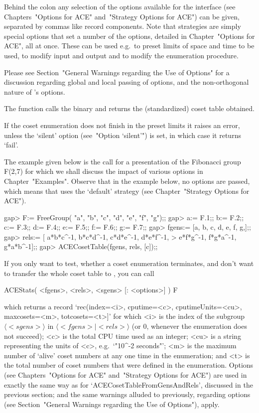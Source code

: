 Behind the colon any  selection  of  the  options  available  for  the
interface (see Chapters~"Options for ACE"  and~"Strategy  Options  for
ACE") can be given, separated by commas like record  components.  Note
that strategies are simply special options that set a  number  of  the
options, detailed in Chapter~"Options for ACE", all at once. These can
be used e.g.~to preset limits of space and time to be used, to  modify
input and output and to modify the enumeration procedure.

Please see Section~"General Warnings regarding the Use of Options" for
a discussion regarding global and local passing of  options,  and  the
non-orthogonal nature of {\ACE}'s options.

The function calls the {\ACE} binary and  returns  the  (standardized)
coset table obtained.

If the coset enumeration does not  finish  in  the  preset  limits  it
raises an error, unless the `silent' option (see~"Option `silent'") is
set, in which case it returns `fail'.

The example given  below  is  the  call  for  a  presentation  of  the
Fibonacci group F(2,7) for  which  we  shall  discuss  the  impact  of
various options in Chapter~"Examples". Observe  that  in  the  example
below, no options  are  passed,  which  means  that  {\ACE}  uses  the
`default' strategy (see Chapter~"Strategy Options for ACE").

\begintt
gap> F:= FreeGroup( "a", "b", "c", "d", "e", "f", "g");;
gap> a:= F.1;; b:= F.2;; c:= F.3;; d:= F.4;; e:= F.5;; f:= F.6;; g:= F.7;;
gap> fgens:= [a, b, c, d, e, f, g,];;
gap> rels:= [ a*b*c^-1, b*c*d^-1, c*d*e^-1, d*e*f^-1, 
>             e*f*g^-1, f*g*a^-1, g*a*b^-1];;
gap> ACECosetTable(fgens, rels, [c]);;
\endtt


If you only want to  test, whether a coset enumeration terminates, and
don't want to  transfer the whole coset table  to {\GAP}, you can call

\>ACEStats( <fgens>, <rels>, <sgens> [: <options>] ) F

which returns a record `rec(index=<i>, cputime=<c>, cputimeUnits=<cu>,
maxcosets=<m>, totcosets=<t>]' for which  <i>  is  the  index  of  the
subgroup $\langle <sgens> \rangle$ in  $\langle  <fgens>  \mid  <rels>
\rangle$ (or $0$, whenever the enumeration does not succeed);  <c>  is
the total CPU time used as an integer; <cu> is a  string  representing
the units of <c>, e.g.~`"10^-2 seconds"'; <m> is the maximum number of
\lq{}alive' coset numbers at any one time in the enumeration; and  <t>
is the total  number  of  coset  numbers  that  were  defined  in  the
enumeration. Options (see  Chapters~"Options  for  ACE"  and~"Strategy
Options  for  ACE")  are  used  in  exactly  the  same  way   as   for
`ACECosetTableFromGensAndRels',  discussed in  the  previous  section;
and the same warnings alluded to previously,  regarding  options  (see
Section~"General Warnings regarding the Use of Options"), apply.

